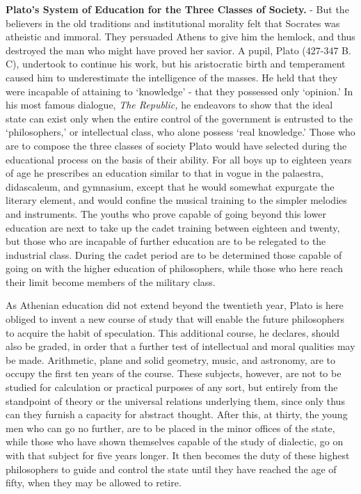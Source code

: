 \documentclass[
]{book}
\begin{document}
\textbf{Plato's System of Education for the Three Classes of Society.} - But the believers in the old traditions and institutional morality felt that Socrates was atheistic and immoral. They persuaded Athens to give him the hemlock, and thus destroyed the man who might have proved her savior. A pupil, Plato (427-347 B. C), undertook to continue his work, but his aristocratic birth and temperament caused him to underestimate the intelligence of the masses. He held that they were incapable of attaining to `knowledge' - that they possessed only `opinion.' In his most famous dialogue, \emph{The Republic,} he endeavors to show that the ideal state can exist only when the entire control of the government is entrusted to the `philosophers,' or intellectual class, who alone possess `real knowledge.' Those who are to compose the three classes of society Plato would have selected during the educational process on the basis of their ability. For all boys up to eighteen years of age he prescribes an education similar to that in vogue in the palaestra, didascaleum, and gymnasium, except that he would somewhat expurgate the literary element, and would confine the musical training to the simpler melodies and instruments. The youths who prove capable of going beyond this lower education are next to take up the cadet training between eighteen and twenty, but those who are incapable of further education are to be relegated to the industrial class. During the cadet period are to be determined those capable of going on with the higher education of philosophers, while those who here reach their limit become members of the military class.

As Athenian education did not extend beyond the twentieth year, Plato is here obliged to invent a new course of study that will enable the future philosophers to acquire the habit of speculation. This additional course, he declares, should also be graded, in order that a further test of intellectual and moral qualities may be made. Arithmetic, plane and solid geometry, music, and astronomy, are to occupy the first ten years of the course. These subjects, however, are not to be studied for calculation or practical purposes of any sort, but entirely from the standpoint of theory or the universal relations underlying them, since only thus can they furnish a capacity for abstract thought. After this, at thirty, the young men who can go no further, are to be placed in the minor offices of the state, while those who have shown themselves capable of the study of dialectic, go on with that subject for five years longer. It then becomes the duty of these highest philosophers to guide and control the state until they have reached the age of fifty, when they may be allowed to retire.
\end{document}
